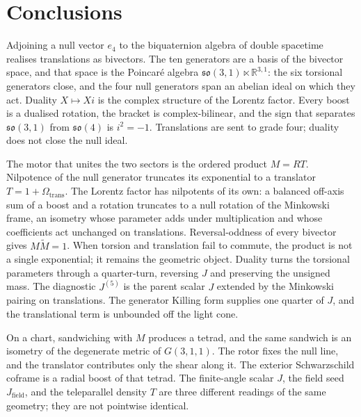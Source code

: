 \documentclass[a4paper]{article}
\begin{document}
\section{Conclusions}
\label{sec:conclusions}

Adjoining a null vector \(e_{4}\) to the biquaternion algebra of double spacetime realises translations as bivectors. The ten generators are a basis of the bivector space, and that space is the Poincar\'{e} algebra \(\mathfrak{so}(3,1)\ltimes\mathbb{R}^{3,1}\): the six torsional generators close, and the four null generators span an abelian ideal on which they act. Duality \(X\mapsto Xi\) is the complex structure of the Lorentz factor. Every boost is a dualised rotation, the bracket is complex-bilinear, and the sign that separates \(\mathfrak{so}(3,1)\) from \(\mathfrak{so}(4)\) is \(i^{2}=-1\). Translations are sent to grade four; duality does not close the null ideal.

The motor that unites the two sectors is the ordered product \(M=RT\). Nilpotence of the null generator truncates its exponential to a translator \(T=1+\Omega_{\mathrm{trans}}\). The Lorentz factor has nilpotents of its own: a balanced off-axis sum of a boost and a rotation truncates to a null rotation of the Minkowski frame, an isometry whose parameter adds under multiplication and whose coefficients act unchanged on translations. Reversal-oddness of every bivector gives \(M\widetilde{M}=1\). When torsion and translation fail to commute, the product is not a single exponential; it remains the geometric object. Duality turns the torsional parameters through a quarter-turn, reversing \(J\) and preserving the unsigned mass. The diagnostic \(J^{(5)}\) is the parent scalar \(J\) extended by the Minkowski pairing on translations. The generator Killing form supplies one quarter of \(J\), and the translational term is unbounded off the light cone.

On a chart, sandwiching with \(M\) produces a tetrad, and the same sandwich is an isometry of the degenerate metric of \(G(3,1,1)\). The rotor fixes the null line, and the translator contributes only the shear along it. The exterior Schwarzschild coframe is a radial boost of that tetrad. The finite-angle scalar \(J\), the field seed \(J_{\mathrm{field}}\), and the teleparallel density \(T\) are three different readings of the same geometry; they are not pointwise identical.
\end{document}
